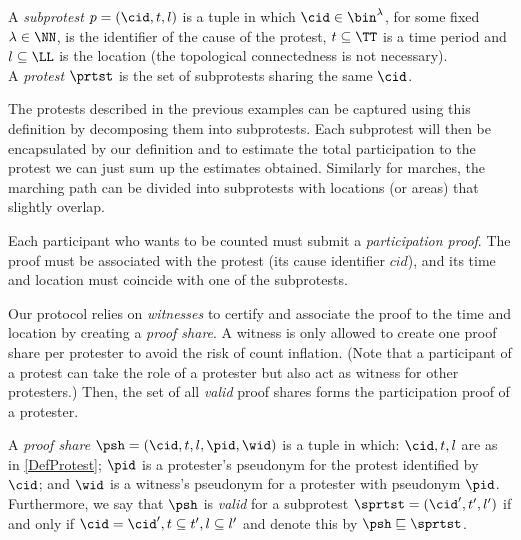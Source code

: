 \begin{definition}\label{DefProtest}
  A \emph{subprotest} \(p = (\cid, t, l)\) is a tuple in which \(\cid\in \bin^{\lambda}\), for some fixed \(\lambda\in \NN\), is the identifier of the cause of the protest, \(t \subseteq \TT\) is a time period and \(l \subseteq \LL\) is the location (the topological connectedness is not necessary).\\
  A \emph{protest} \(\prtst\) is the set of subprotests sharing the same \(\cid\).
\end{definition}

The protests described in the previous examples can be captured using this definition by decomposing them into subprotests.
Each subprotest will then be encapsulated by our definition and to estimate the total participation to the protest we can just sum up the estimates obtained.
Similarly for marches, the marching path can be divided into subprotests with locations (or areas) that slightly overlap.

Each participant who wants to be counted must submit a \emph{participation proof}.
The proof must be associated with the protest (\ie its cause identifier \(cid\)), and its time and location must coincide with one of the subprotests.

Our protocol relies on \emph{witnesses} to certify and associate the proof to the time and location by creating a \emph{proof share}.
A witness is only allowed to create one proof share per protester to avoid the risk of count inflation.
(Note that a participant of a protest can take the role of a protester but also 
act as witness for other protesters.)
Then, the set of all \emph{valid} proof shares forms the participation proof of a protester.


\begin{definition}%
  \label{DefProofShare}\label{DefProofShares}
  A \emph{proof share} \(\psh = (\cid, t, l, \pid, \wid)\) is a tuple in which: 
  \(\cid, t, l\) are as in \cref{DefProtest};
  \(\pid\) is a protester's pseudonym for the protest identified by \(\cid\); and \(\wid\) is a witness's pseudonym for a protester with pseudonym \(\pid\).\\
  Furthermore, we say that \(\psh\) is \emph{valid} for a subprotest \(\sprtst = (\cid', t', l')\) if and only if \(\cid = \cid', t\subseteq t', l\subseteq l'\) and denote this by 
  \(\psh \sqsubseteq \sprtst\).
  
\end{definition}

